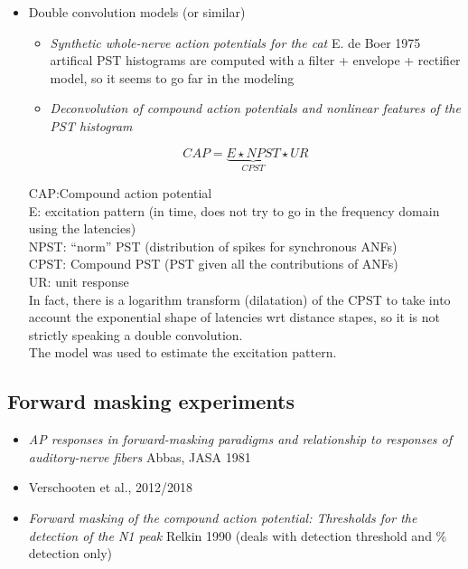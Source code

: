 \documentclass[]{article}
\providecommand{\tightlist}{%
  \setlength{\itemsep}{0pt}\setlength{\parskip}{0pt}}
\begin{document}
\clearpage

\begin{itemize}
\item
  Double convolution models (or similar)

  \begin{itemize}
  \tightlist
  \item
    \emph{Synthetic whole-nerve action potentials for the cat} E. de
    Boer 1975 artifical PST histograms are computed with a filter +
    envelope + rectifier model, so it seems to go far in the modeling
  \item
    \emph{Deconvolution of compound action potentials and nonlinear
    features of the PST histogram} \citep{Bappert1980}
  \end{itemize}

  \[CAP = \underbrace{E \star NPST}_{CPST} \star UR\]

  CAP:Compound action potential\\
  E: excitation pattern (in time, does not try to go in the frequency
  domain using the latencies)\\
  NPST: ``norm'' PST (distribution of spikes for synchronous ANFs)\\
  CPST: Compound PST (PST given all the contributions of ANFs)\\
  UR: unit response\\
  In fact, there is a logarithm transform (dilatation) of the CPST to
  take into account the exponential shape of latencies wrt distance
  stapes, so it is not strictly speaking a double convolution.\\
  The model was used to estimate the excitation pattern.
\end{itemize}

\hypertarget{forward-masking-experiments}{%
\subsection{Forward masking
experiments}\label{forward-masking-experiments}}

\begin{itemize}
\tightlist
\item
  \emph{AP responses in forward-masking paradigms and relationship to
  responses of auditory-nerve fibers} Abbas, JASA 1981 \citep{Abbas1981}
\item
  Verschooten et al., 2012/2018 \citep{verschooten2012, Verschooten2018}
\item
  \emph{Forward masking of the compound action potential: Thresholds for
  the detection of the N1 peak} Relkin 1990 (deals with detection
  threshold and \% detection only) \citep{Relkin1991}
\end{itemize}
\end{document}
